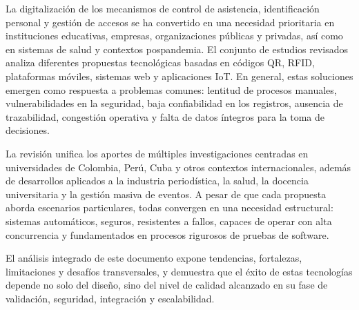 La digitalización de los mecanismos de control de asistencia, identificación personal y gestión de accesos se ha convertido en una necesidad prioritaria en instituciones educativas, empresas, organizaciones públicas y privadas, así como en sistemas de salud y contextos pospandemia. El conjunto de estudios revisados analiza diferentes propuestas tecnológicas basadas en códigos QR, RFID, plataformas móviles, sistemas web y aplicaciones IoT. En general, estas soluciones emergen como respuesta a problemas comunes: lentitud de procesos manuales, vulnerabilidades en la seguridad, baja confiabilidad en los registros, ausencia de trazabilidad, congestión operativa y falta de datos íntegros para la toma de decisiones.

La revisión unifica los aportes de múltiples investigaciones centradas en universidades de Colombia, Perú, Cuba y otros contextos internacionales, además de desarrollos aplicados a la industria periodística, la salud, la docencia universitaria y la gestión masiva de eventos. A pesar de que cada propuesta aborda escenarios particulares, todas convergen en una necesidad estructural: sistemas automáticos, seguros, resistentes a fallos, capaces de operar con alta concurrencia y fundamentados en procesos rigurosos de pruebas de software.

El análisis integrado de este documento expone tendencias, fortalezas, limitaciones y desafíos transversales, y demuestra que el éxito de estas tecnologías depende no solo del diseño, sino del nivel de calidad alcanzado en su fase de validación, seguridad, integración y escalabilidad.
